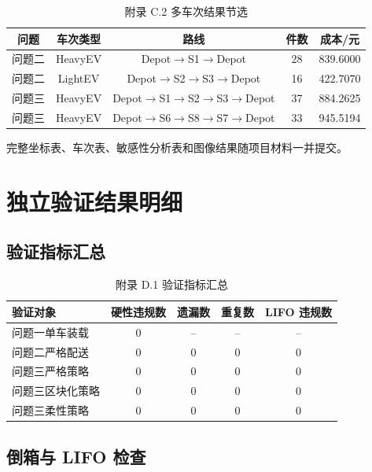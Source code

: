 ﻿\documentclass[UTF8,a4paper,12pt]{ctexart}
\begin{document}
	\begin{table}[H]
		\centering
		\caption{附录 C.2 多车次结果节选}
		\begin{tabular}{c c c c c}
			\toprule
			问题 & 车次类型 & 路线 & 件数 & 成本/元 \\
			\midrule
			问题二 & HeavyEV & Depot$\rightarrow$S1$\rightarrow$Depot & 28 & 839.6000 \\
			问题二 & LightEV & Depot$\rightarrow$S2$\rightarrow$S3$\rightarrow$Depot & 16 & 422.7070 \\
			问题三 & HeavyEV & Depot$\rightarrow$S1$\rightarrow$S2$\rightarrow$S3$\rightarrow$Depot & 37 & 884.2625 \\
			问题三 & HeavyEV & Depot$\rightarrow$S6$\rightarrow$S8$\rightarrow$S7$\rightarrow$Depot & 33 & 945.5194 \\
			\bottomrule
		\end{tabular}
	\end{table}
	
	完整坐标表、车次表、敏感性分析表和图像结果随项目材料一并提交。
	
	\section{独立验证结果明细}
	
	\subsection{验证指标汇总}
	
	\begin{table}[H]
		\centering
		\caption{附录 D.1 验证指标汇总}
		\begin{tabular}{l c c c c}
			\toprule
			验证对象 & 硬性违规数 & 遗漏数 & 重复数 & LIFO 违规数 \\
			\midrule
			问题一单车装载 & 0 & -- & -- & -- \\
			问题二严格配送 & 0 & 0 & 0 & 0 \\
			问题三严格策略 & 0 & 0 & 0 & 0 \\
			问题三区块化策略 & 0 & 0 & 0 & 0 \\
			问题三柔性策略 & 0 & 0 & 0 & 0 \\
			\bottomrule
		\end{tabular}
	\end{table}
	
	\subsection{倒箱与 LIFO 检查}
	
\end{document}
